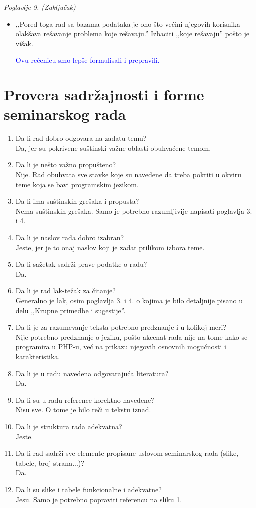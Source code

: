 \documentclass[a4paper]{report}
\newcommand{\odgovor}[1]{\textcolor{blue}{#1}}
\begin{document}
\textit{Poglavlje 9. (Zaključak)}
\begin{itemize}
\item ,,Pored toga rad sa bazama podataka je ono što većini njegovih korisnika olakšava rešavanje problema koje rešavaju.'' Izbaciti ,,koje rešavaju'' pošto je višak.

\odgovor{Ovu rečenicu smo lepše formulisali i prepravili.}

\end{itemize}

\section{Provera sadržajnosti i forme seminarskog rada}

\begin{enumerate}
\item Da li rad dobro odgovara na zadatu temu?\\ Da, jer su pokrivene suštinski važne oblasti obuhvaćene temom.
\item Da li je nešto važno propušteno?\\ Nije. Rad obuhvata sve stavke koje su navedene da treba pokriti u okviru teme koja se bavi programskim jezikom.
\item Da li ima suštinskih grešaka i propusta?\\ Nema suštinskih grešaka. Samo je potrebno razumljivije napisati poglavlja 3. i 4.
\item Da li je naslov rada dobro izabran?\\ Jeste, jer je to onaj naslov koji je zadat prilikom izbora teme.
\item Da li sažetak sadrži prave podatke o radu?\\ Da.
\item Da li je rad lak-težak za čitanje?\\ Generalno je lak, osim poglavlja 3. i 4. o kojima je bilo detaljnije pisano u delu ,,Krupne primedbe i sugestije''.
\item Da li je za razumevanje teksta potrebno predznanje i u kolikoj meri?\\ Nije potrebno predznanje o jeziku, pošto akcenat rada nije na tome kako se programira u PHP-u, već na prikazu njegovih osnovnih mogućnosti i karakteristika.
\item Da li je u radu navedena odgovarajuća literatura?\\ Da.
\item Da li su u radu reference korektno navedene?\\ Nisu sve. O tome je bilo reči u tekstu iznad.
\item Da li je struktura rada adekvatna?\\ Jeste.
\item Da li rad sadrži sve elemente propisane uslovom seminarskog rada (slike, tabele, broj strana...)?\\ Da.
\item Da li su slike i tabele funkcionalne i adekvatne?\\ Jesu. Samo je potrebno popraviti referencu na sliku 1.
\end{enumerate}
\end{document}
